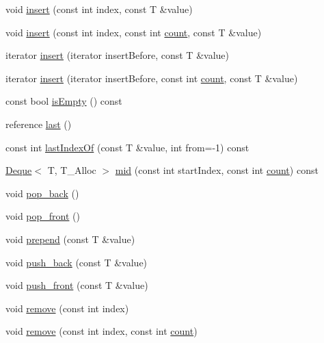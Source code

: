 \begin{DoxyCompactItemize}
\item 
void \hyperlink{namespaceprism_1_1aux_a8c71b4a5c4b411080d5eb9f6838cafc4}{insert} (const int index, const T \&value)
\item 
void \hyperlink{namespaceprism_1_1aux_a3aa62fda77a8d7b6c7ad69667ef1933a}{insert} (const int index, const int \hyperlink{namespaceprism_1_1aux_a14e4de22b19399e53423b408f624d866}{count}, const T \&value)
\item 
iterator \hyperlink{namespaceprism_1_1aux_aa6279cb02a74270d3bff40cf30544435}{insert} (iterator insert\+Before, const T \&value)
\item 
iterator \hyperlink{namespaceprism_1_1aux_a5ddea176e048992d6fcc28bf6afc27ba}{insert} (iterator insert\+Before, const int \hyperlink{namespaceprism_1_1aux_a14e4de22b19399e53423b408f624d866}{count}, const T \&value)
\item 
const bool \hyperlink{namespaceprism_1_1aux_a056cd3e2a9b275da43658b45cb141852}{is\+Empty} () const 
\item 
reference \hyperlink{namespaceprism_1_1aux_a23a89c64fd9ee1f27799fe56c943a44d}{last} ()
\item 
const int \hyperlink{namespaceprism_1_1aux_a659abf22d71ad1fd29c47d89cf2f6fca}{last\+Index\+Of} (const T \&value, int from=-\/1) const 
\item 
\hyperlink{namespaceprism_1_1aux_a73d05f9bac6f1390e68c9ca400dd90b7}{Deque}$<$ T, T\+\_\+\+Alloc $>$ \hyperlink{namespaceprism_1_1aux_a8c605820c19faa728da11c03594c190b}{mid} (const int start\+Index, const int \hyperlink{namespaceprism_1_1aux_a14e4de22b19399e53423b408f624d866}{count}) const 
\item 
void \hyperlink{namespaceprism_1_1aux_adfb30c347546bd5c87ab178fbc190240}{pop\+\_\+back} ()
\item 
void \hyperlink{namespaceprism_1_1aux_a40a336a70bbe1a3f059b4d7b1f41bd29}{pop\+\_\+front} ()
\item 
void \hyperlink{namespaceprism_1_1aux_a386d12e2908c0967706007f47883994b}{prepend} (const T \&value)
\item 
void \hyperlink{namespaceprism_1_1aux_a5638dc8c76cc3834f9371efcb4ec028f}{push\+\_\+back} (const T \&value)
\item 
void \hyperlink{namespaceprism_1_1aux_ad3e0c5f7eadd3f6a3fe99dc469de11ee}{push\+\_\+front} (const T \&value)
\item 
void \hyperlink{namespaceprism_1_1aux_a12ddcb0855cf8ec32503548006dd26c6}{remove} (const int index)
\item 
void \hyperlink{namespaceprism_1_1aux_a2940f156104bc560804fb6c26c9389a2}{remove} (const int index, const int \hyperlink{namespaceprism_1_1aux_a14e4de22b19399e53423b408f624d866}{count})

\end{DoxyCompactItemize}
